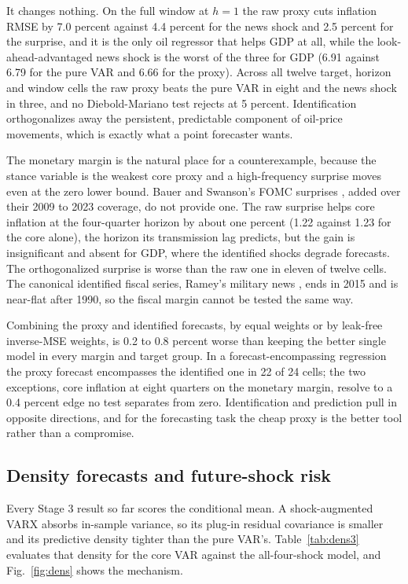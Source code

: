 \documentclass[conference]{IEEEtran}
\begin{document}
It changes nothing. On the full window at $h=1$ the raw proxy cuts inflation RMSE by 7.0 percent against 4.4 percent for the news shock and 2.5 percent for the surprise, and it is the only oil regressor that helps GDP at all, while the look-ahead-advantaged news shock is the worst of the three for GDP (6.91 against 6.79 for the pure VAR and 6.66 for the proxy). Across all twelve target, horizon and window cells the raw proxy beats the pure VAR in eight and the news shock in three, and no Diebold-Mariano test rejects at 5 percent. Identification orthogonalizes away the persistent, predictable component of oil-price movements, which is exactly what a point forecaster wants.

The monetary margin is the natural place for a counterexample, because the stance variable is the weakest core proxy and a high-frequency surprise moves even at the zero lower bound. Bauer and Swanson's FOMC surprises \cite{bauerswanson2023}, added over their 2009 to 2023 coverage, do not provide one. The raw surprise helps core inflation at the four-quarter horizon by about one percent (1.22 against 1.23 for the core alone), the horizon its transmission lag predicts, but the gain is insignificant and absent for GDP, where the identified shocks degrade forecasts. The orthogonalized surprise is worse than the raw one in eleven of twelve cells. The canonical identified fiscal series, Ramey's military news \cite{ramey2011}, ends in 2015 and is near-flat after 1990, so the fiscal margin cannot be tested the same way.

Combining the proxy and identified forecasts, by equal weights or by leak-free inverse-MSE weights, is 0.2 to 0.8 percent worse than keeping the better single model in every margin and target group. In a forecast-encompassing regression the proxy forecast encompasses the identified one in 22 of 24 cells; the two exceptions, core inflation at eight quarters on the monetary margin, resolve to a 0.4 percent edge no test separates from zero. Identification and prediction pull in opposite directions, and for the forecasting task the cheap proxy is the better tool rather than a compromise.

\subsection{Density forecasts and future-shock risk}
Every Stage 3 result so far scores the conditional mean. A shock-augmented VARX absorbs in-sample variance, so its plug-in residual covariance is smaller and its predictive density tighter than the pure VAR's. Table~\ref{tab:dens3} evaluates that density for the core VAR against the all-four-shock model, and Fig.~\ref{fig:dens} shows the mechanism.
\end{document}
